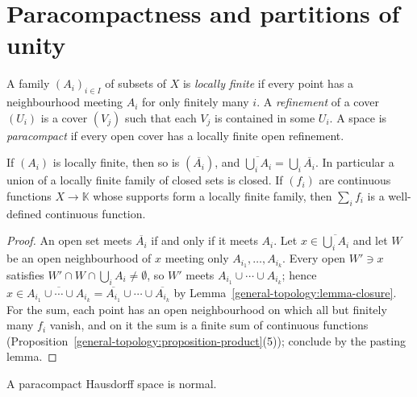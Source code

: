 \section{Paracompactness and partitions of unity}\label{general-topology:section-paracompactness}

\begin{definition}\label{general-topology:definition-paracompact}
A family $(A_i)_{i \in I}$ of subsets of $X$ is \emph{locally finite} if every point has a neighbourhood meeting $A_i$ for only finitely many $i$. A
\emph{refinement} of a cover $(U_i)$ is a cover $(V_j)$ such that each $V_j$ is contained in some $U_i$. A space is \emph{paracompact} if every open cover has
a locally finite open refinement.
\end{definition}

\begin{lemma}\label{general-topology:lemma-locally-finite}
If $(A_i)$ is locally finite, then so is $(\overline{A_i})$, and $\overline{\bigcup_i A_i} = \bigcup_i \overline{A_i}$. In particular a union of a locally finite
family of closed sets is closed. If $(f_i)$ are continuous functions $X \to \mathbb{K}$ whose supports form a locally finite family, then $\sum_i f_i$ is a
well-defined continuous function.
\end{lemma}

\begin{proof}
An open set meets $\overline{A_i}$ if and only if it meets $A_i$. Let $x \in \overline{\bigcup_i A_i}$ and let $W$ be an open neighbourhood of $x$ meeting only
$A_{i_1}, \ldots, A_{i_k}$. Every open $W' \ni x$ satisfies $W' \cap W \cap \bigcup_i A_i \neq \emptyset$, so $W'$ meets $A_{i_1} \cup \cdots \cup A_{i_k}$; hence
$x \in \overline{A_{i_1} \cup \cdots \cup A_{i_k}} = \overline{A_{i_1}} \cup \cdots \cup \overline{A_{i_k}}$ by Lemma~\ref{general-topology:lemma-closure}. For the
sum, each point has an open neighbourhood on which all but finitely many $f_i$ vanish, and on it the sum is a finite sum of continuous functions
(Proposition~\ref{general-topology:proposition-product}(5)); conclude by the pasting lemma.
\end{proof}

\begin{proposition}\label{general-topology:proposition-paracompact-normal}
A paracompact Hausdorff space is normal.
\end{proposition}

